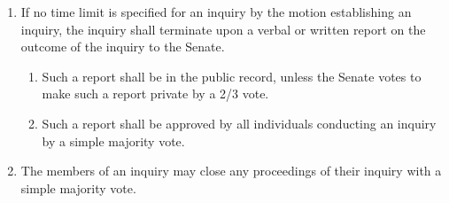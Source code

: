\documentclass{uniondoc}
\begin{document}
\begin{enumerate}
	\item If no time limit is specified for an inquiry by the motion establishing an inquiry, the inquiry shall terminate upon a verbal or written report on the outcome of the inquiry to the Senate.
	      \begin{enumerate}
		      \item Such a report shall be in the public record, unless the Senate votes to make such a report private by a 2/3 vote.
		      \item Such a report shall be approved by all individuals conducting an inquiry by a simple majority vote.
	      \end{enumerate}
	\item The members of an inquiry may close any proceedings of their inquiry with a simple majority vote.
\end{enumerate}
\end{document}
